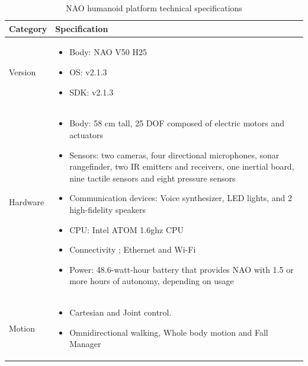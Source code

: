 \begin{table}[H]
\centering
\small
\caption{NAO humanoid platform technical specifications}
\label{table:nao_spec}
    \begin{tabular}{ | l | p{12cm} |}
    \hline
    \textbf{Category} & \textbf{Specification} \\
   \hline
  Version & \begin{itemize}[leftmargin=*,topsep={0pt},itemsep={0pt},partopsep={0pt},parsep={0pt}] \item Body: NAO V50 H25 
                                                                                                  \item OS: v2.1.3
                                                                                                  \item SDK: v2.1.3  \end{itemize} \\
                                          \hline
  Hardware & \begin{itemize}[leftmargin=*,topsep={0pt},itemsep={0pt},partopsep={0pt},parsep={0pt}] \item Body: 58 cm tall, 25 DOF composed of electric motors and actuators
  							\item Sensors: two cameras, four directional microphones, sonar rangefinder, two IR emitters and receivers, one inertial board, nine tactile sensors and eight pressure sensors
  							\item Communication devices: Voice synthesizer, LED lights, and 2 high-fidelity speakers
  							\item CPU: Intel ATOM 1.6ghz CPU 
  							\item Connectivity ; Ethernet and Wi-Fi
  							\item Power: 48.6-watt-hour battery that provides NAO with 1.5 or more hours of autonomy, depending on usage \end{itemize} \\
                                          \hline
                                          
  Motion  & \begin{itemize}[leftmargin=*,topsep={0pt},itemsep={0pt},partopsep={0pt},parsep={0pt}] \item Cartesian and Joint control. \item Omnidirectional walking, Whole body motion and Fall Manager \end{itemize} \\
                                          \hline
  

\end{tabular}
\end{table}
